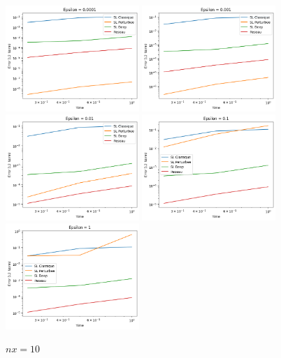 \documentclass{article}
\begin{document}
\begin{figure}[h]
    \centering
    \includegraphics[width=0.45\textwidth]{images/10ep11.png}
    \includegraphics[width=0.45\textwidth]{images/10ep12.png}
    \includegraphics[width=0.45\textwidth]{images/10ep13.png}
    \includegraphics[width=0.45\textwidth]{images/10ep14.png}
    \includegraphics[width=0.45\textwidth]{images/10ep15.png}
    \caption{$nx = 10$}
\end{figure}
\end{document}
